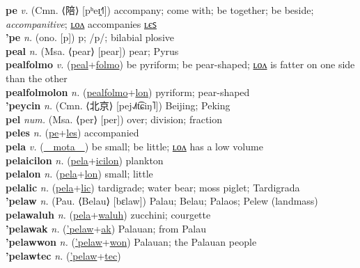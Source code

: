 \textbf{pe} \textit{v.} (Cmn. ⟨陪⟩ [pʰeɪ̯˧˥])
accompany; come with; be together; be beside; \textit{accompanitive}; \hyperref[pelon]{ʟᴏᴧ} accompanies \hyperref[peles]{ʟєꜱ} \label{pe} \\
\textbf{'pe} \textit{n.} (ono. [p])
p; /p/; bilabial plosive \label{'pe} \\
\textbf{peal} \textit{n.} (Msa. ⟨pear⟩ [pear])
pear; Pyrus \label{peal} \\
\textbf{pealfolmo} \textit{v.} (\hyperref[peal]{peal}+\hyperref[folmo]{folmo})
be pyriform; be pear-shaped; \hyperref[pealfolmolon]{ʟᴏᴧ} is fatter on one side than the other \label{pealfolmo} \\
\textbf{pealfolmolon} \textit{n.} (\hyperref[pealfolmo]{pealfolmo}+\hyperref[lon]{lon})
pyriform; pear-shaped \label{pealfolmolon} \\
\textbf{'peycin} \textit{n.} (Cmn. ⟨北京⟩ [pej˨˩˦t͡ɕiŋ˥])
Beijing; Peking \label{'peycin} \\
\textbf{pel} \textit{num.} (Msa. ⟨per⟩ [per])
over; division; fraction \label{pel} \\
\textbf{peles} \textit{n.} (\hyperref[pe]{pe}+\hyperref[les]{les})
accompanied \label{peles} \\
\textbf{pela} \textit{v.} (\hyperref[mota]{~~mota~~})
be small; be little; \hyperref[pelalon]{ʟᴏᴧ} has a low volume \label{pela} \\
\textbf{pelaicilon} \textit{n.} (\hyperref[pela]{pela}+\hyperref[icilon]{icilon})
plankton \label{pelaicilon} \\
\textbf{pelalon} \textit{n.} (\hyperref[pela]{pela}+\hyperref[lon]{lon})
small; little \label{pelalon} \\
\textbf{pelalic} \textit{n.} (\hyperref[pela]{pela}+\hyperref[lic]{lic})
tardigrade; water bear; moss piglet; Tardigrada \label{pelalic} \\
\textbf{'pelaw} \textit{n.} (Pau. ⟨Belau⟩ [bɛlaw])
Palau; Belau; Palaos; Pelew (landmass) \label{'pelaw} \\
\textbf{pelawaluh} \textit{n.} (\hyperref[pela]{pela}+\hyperref[waluh]{waluh})
zucchini; courgette \label{pelawaluh} \\
\textbf{'pelawak} \textit{n.} (\hyperref['pelaw]{'pelaw}+\hyperref[ak]{ak})
Palauan; from Palau \label{'pelawak} \\
\textbf{'pelawwon} \textit{n.} (\hyperref['pelaw]{'pelaw}+\hyperref[won]{won})
Palauan; the Palauan people \label{'pelawwon} \\
\textbf{'pelawtec} \textit{n.} (\hyperref['pelaw]{'pelaw}+\hyperref[tec]{tec})
